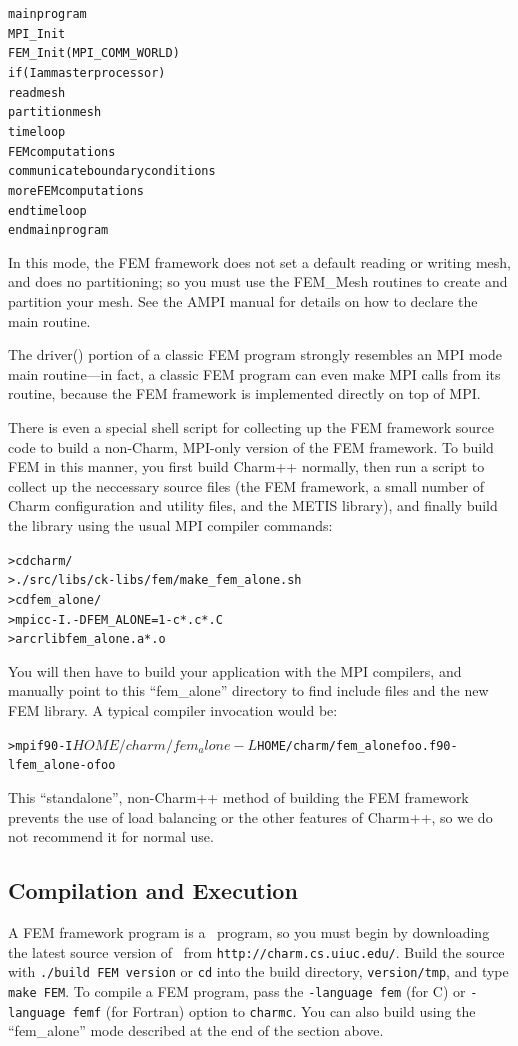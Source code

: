 \documentclass[10pt]{article}
\begin{document}
\begin{alltt}
   main program
      MPI_Init
      FEM_Init(MPI_COMM_WORLD)
      if (I am master processor)
         read mesh
      partition mesh
      time loop
          FEM computations
          communicate boundary conditions
          more FEM computations
      end time loop
   end main program
\end{alltt}

In this mode, the FEM framework does not set a default
reading or writing mesh, and does no partitioning;
so you must use the FEM\_Mesh routines to create and 
partition your mesh.
See the AMPI manual for details on how to declare
the main routine.

The driver() portion of a classic FEM program
strongly resembles an MPI mode main routine---in fact, a classic
FEM program can even make MPI calls from its  
routine, because the FEM framework is implemented directly on
top of MPI.  

There is even a special shell script for collecting
up the FEM framework source code to build a non-Charm, 
MPI-only version of the FEM framework.
To build FEM in this manner, you first build Charm++ normally,
then run a script to collect up the neccessary source files
(the FEM framework, a small number of Charm configuration 
and utility files, and the METIS library),
and finally build the library using the usual MPI compiler 
commands:
\begin{alltt}
 > cd charm/
 > ./src/libs/ck-libs/fem/make_fem_alone.sh
 > cd fem_alone/
 > mpicc -I. -DFEM_ALONE=1 -c *.c *.C 
 > ar cr libfem_alone.a *.o
\end{alltt}
You will then have to build your application with the MPI
compilers, and manually point to this ``fem\_alone'' 
directory to find include files and the new FEM library.
A typical compiler invocation would be:
\begin{alltt}
 > mpif90 -I$HOME/charm/fem_alone -L$HOME/charm/fem_alone foo.f90 -lfem_alone -o foo
\end{alltt}
This ``standalone'', non-Charm++ method of building the 
FEM framework prevents the use of load balancing or the other
features of Charm++, so we do not recommend it for normal use.


\subsection{Compilation and Execution}

A FEM framework program is a \charmpp\ program, so you must begin by
downloading the latest source version of \charmpp\ from
{\tt http://charm.cs.uiuc.edu/}.  Build the source with 
{\tt ./build FEM version} or {\tt cd} into the build directory, 
{\tt version/tmp}, and type {\tt make FEM}.
To compile a FEM program, pass the {\tt -language fem} (for C) or 
{\tt -language femf} (for Fortran) option to {\tt charmc}.
You can also build using the ``fem\_alone'' mode described
at the end of the section above.
\end{document}
